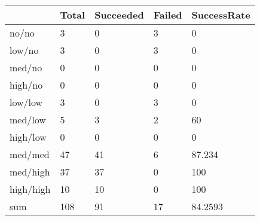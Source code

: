 \begin{tabular}{lllll}
& Total & Succeeded & Failed & SuccessRate \\ 
\hline 
no/no & 3 & 0 & 3 & 0 \\ 
low/no & 3 & 0 & 3 & 0 \\ 
med/no & 0 & 0 & 0 & 0 \\ 
high/no & 0 & 0 & 0 & 0 \\ 
low/low & 3 & 0 & 3 & 0 \\ 
med/low & 5 & 3 & 2 & 60 \\ 
high/low & 0 & 0 & 0 & 0 \\ 
med/med & 47 & 41 & 6 & 87.234 \\ 
med/high & 37 & 37 & 0 & 100 \\ 
high/high & 10 & 10 & 0 & 100 \\ 
sum & 108 & 91 & 17 & 84.2593 \\ 
\hline 
\end{tabular}